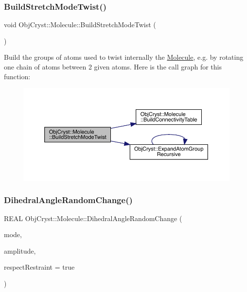 \subsubsection{\texorpdfstring{BuildStretchModeTwist()}{BuildStretchModeTwist()}}
{\footnotesize\ttfamily void Obj\+Cryst\+::\+Molecule\+::\+Build\+Stretch\+Mode\+Twist (\begin{DoxyParamCaption}{ }\end{DoxyParamCaption})}

Build the groups of atoms used to twist internally the \mbox{\hyperlink{class_obj_cryst_1_1_molecule}{Molecule}}, e.\+g. by rotating one chain of atoms between 2 given atoms. Here is the call graph for this function\+:
\nopagebreak
\begin{figure}[H]
\begin{center}
\leavevmode
\includegraphics[width=350pt]{class_obj_cryst_1_1_molecule_a7f4c6bf6e5be59780cb7844e53711fb3_cgraph}
\end{center}
\end{figure}
\mbox{\label{class_obj_cryst_1_1_molecule_afd88ae76ab528b5dc37f9d2527353904}} 
\subsubsection{\texorpdfstring{DihedralAngleRandomChange()}{DihedralAngleRandomChange()}}
{\footnotesize\ttfamily R\+E\+AL Obj\+Cryst\+::\+Molecule\+::\+Dihedral\+Angle\+Random\+Change (\begin{DoxyParamCaption}\item[{const \mbox{\hyperlink{struct_obj_cryst_1_1_stretch_mode_torsion}{Stretch\+Mode\+Torsion}} \&}]{mode,  }\item[{const R\+E\+AL}]{amplitude,  }\item[{const bool}]{respect\+Restraint = {\ttfamily true} }\end{DoxyParamCaption})}

